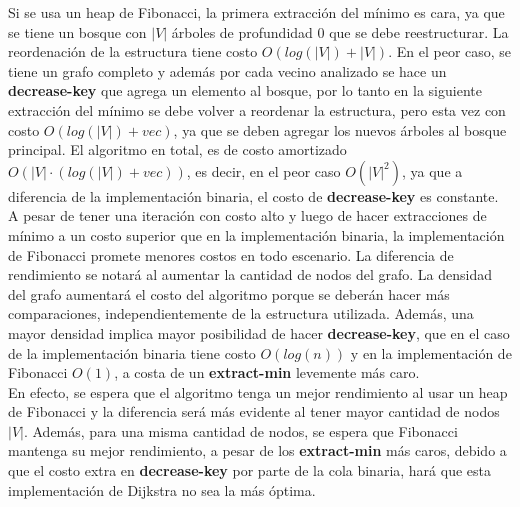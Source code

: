 \documentclass[11pt]{article}
\begin{document}
Si se usa un heap de Fibonacci, la primera extracción del mínimo es cara, ya que se tiene un bosque con $|V|$ árboles de profundidad 0 que se debe reestructurar. La reordenación de la estructura tiene costo $O(log(|V|) + |V|)$. En el peor caso, se tiene un grafo completo y además por cada vecino analizado se hace un \textbf{decrease-key} que agrega un elemento al bosque, por lo tanto en la siguiente extracción del mínimo se debe volver a reordenar la estructura, pero esta vez con costo $O(log(|V|) + vec)$, ya que se deben agregar los nuevos árboles al bosque principal. El algoritmo en total, es de costo amortizado $O(|V| \cdot (log(|V|) + vec))$, es decir, en el peor caso $O(|V|^2)$, ya que a diferencia de la implementación binaria, el costo de \textbf{decrease-key} es constante. \\


A pesar de tener una iteración con costo alto y luego de hacer extracciones de mínimo a un costo superior que en la implementación binaria, la implementación de Fibonacci promete menores costos en todo escenario. La diferencia de rendimiento se notará al aumentar la cantidad de nodos del grafo. La densidad del grafo aumentará el costo del algoritmo porque se deberán hacer más comparaciones, independientemente de la estructura utilizada. Además, una mayor densidad implica mayor posibilidad de hacer \textbf{decrease-key}, que en el caso de la implementación binaria tiene costo $O(log(n))$ y en la implementación de Fibonacci $O(1)$, a costa de un \textbf{extract-min} levemente más caro. \\

En efecto, se espera que el algoritmo tenga un mejor rendimiento al usar un heap de Fibonacci y la diferencia será más evidente al tener mayor cantidad de nodos $|V|$. Además, para una misma cantidad de nodos, se espera que Fibonacci mantenga su mejor rendimiento, a pesar de los \textbf{extract-min} más caros, debido a que el costo extra en \textbf{decrease-key} por parte de la cola binaria, hará que esta implementación de Dijkstra no sea la más óptima.



\end{document}
